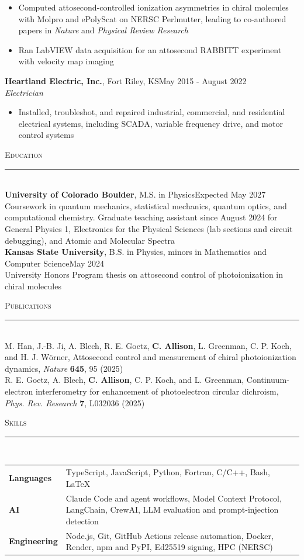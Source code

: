 \documentclass[10pt]{article}
\newcommand{\sect}[1]{
\par\needspace{3\baselineskip}\vspace{8pt}\noindent\large{\textsc{#1}}\\[-8pt]\normalsize{\noindent\rule{\textwidth}{0.5pt}}\\[-2pt]
}
\newcommand{\job}[4]{\textbf{#1}, #2\hfill #3\\ \textit{#4}}
\begin{document}
\begin{itemize}
	\item Computed attosecond-controlled ionization asymmetries in chiral molecules with Molpro and ePolyScat on NERSC Perlmutter, leading to co-authored papers in \textit{Nature} and \textit{Physical Review Research}
	\item Ran LabVIEW data acquisition for an attosecond RABBITT experiment with velocity map imaging
\end{itemize}
\job{Heartland Electric, Inc.}{Fort Riley, KS}{May 2015 - August 2022}{Electrician}
\begin{itemize}
	\item Installed, troubleshot, and repaired industrial, commercial, and residential electrical systems, including SCADA, variable frequency drive, and motor control systems
\end{itemize}

\sect{Education}
\textbf{University of Colorado Boulder}, M.S. in Physics\hfill Expected May 2027\\
Coursework in quantum mechanics, statistical mechanics, quantum optics, and computational chemistry. Graduate teaching assistant since August 2024 for General Physics 1, Electronics for the Physical Sciences (lab sections and circuit debugging), and Atomic and Molecular Spectra\\[4pt]
\textbf{Kansas State University}, B.S. in Physics, minors in Mathematics and Computer Science\hfill May 2024\\
University Honors Program thesis on attosecond control of photoionization in chiral molecules

\sect{Publications}
M. Han, J.-B. Ji, A. Blech, R. E. Goetz, \textbf{C. Allison}, L. Greenman, C. P. Koch, and H. J. W\"{o}rner, Attosecond control and measurement of chiral photoionization dynamics, \textit{Nature} \textbf{645}, 95 (2025)\\[3pt]
R. E. Goetz, A. Blech, \textbf{C. Allison}, C. P. Koch, and L. Greenman, Continuum-electron interferometry for enhancement of photoelectron circular dichroism, \textit{Phys. Rev. Research} \textbf{7}, L032036 (2025)

\sect{Skills}
\noindent\begin{tabular}{@{}p{2.6cm}p{\dimexpr\textwidth-2.6cm-2\tabcolsep\relax}@{}}
	\rule{0pt}{11pt}\textbf{Languages} & TypeScript, JavaScript, Python, Fortran, C/C++, Bash, \LaTeX \\
	\textbf{AI} & Claude Code and agent workflows, Model Context Protocol, LangChain, CrewAI, LLM evaluation and prompt-injection detection \\
	\textbf{Engineering} & Node.js, Git, GitHub Actions release automation, Docker, Render, npm and PyPI, Ed25519 signing, HPC (NERSC) \\
\end{tabular}
\end{document}
